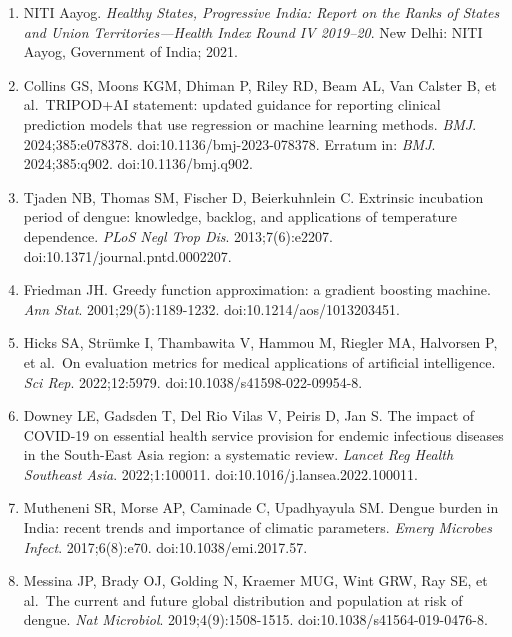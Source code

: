 \documentclass[
  10pt,
  twocolumn]{article}
\begin{document}
\begin{enumerate}
  doi:10.1016/j.patter.2023.100804.
\item
  NITI Aayog. \emph{Healthy States, Progressive India: Report on the
  Ranks of States and Union Territories---Health Index Round IV
  2019--20}. New Delhi: NITI Aayog, Government of India; 2021.
\item
  Collins GS, Moons KGM, Dhiman P, Riley RD, Beam AL, Van Calster B, et
  al.~TRIPOD+AI statement: updated guidance for reporting clinical
  prediction models that use regression or machine learning methods.
  \emph{BMJ}. 2024;385:e078378. doi:10.1136/bmj-2023-078378. Erratum in:
  \emph{BMJ}. 2024;385:q902. doi:10.1136/bmj.q902.
\item
  Tjaden NB, Thomas SM, Fischer D, Beierkuhnlein C. Extrinsic incubation
  period of dengue: knowledge, backlog, and applications of temperature
  dependence. \emph{PLoS Negl Trop Dis}. 2013;7(6):e2207.
  doi:10.1371/journal.pntd.0002207.
\item
  Friedman JH. Greedy function approximation: a gradient boosting
  machine. \emph{Ann Stat}. 2001;29(5):1189-1232.
  doi:10.1214/aos/1013203451.
\item
  Hicks SA, Strümke I, Thambawita V, Hammou M, Riegler MA, Halvorsen P,
  et al.~On evaluation metrics for medical applications of artificial
  intelligence. \emph{Sci Rep}. 2022;12:5979.
  doi:10.1038/s41598-022-09954-8.
\item
  Downey LE, Gadsden T, Del Rio Vilas V, Peiris D, Jan S. The impact of
  COVID-19 on essential health service provision for endemic infectious
  diseases in the South-East Asia region: a systematic review.
  \emph{Lancet Reg Health Southeast Asia}. 2022;1:100011.
  doi:10.1016/j.lansea.2022.100011.
\item
  Mutheneni SR, Morse AP, Caminade C, Upadhyayula SM. Dengue burden in
  India: recent trends and importance of climatic parameters.
  \emph{Emerg Microbes Infect}. 2017;6(8):e70. doi:10.1038/emi.2017.57.
\item
  Messina JP, Brady OJ, Golding N, Kraemer MUG, Wint GRW, Ray SE, et
  al.~The current and future global distribution and population at risk
  of dengue. \emph{Nat Microbiol}. 2019;4(9):1508-1515.
  doi:10.1038/s41564-019-0476-8.
\end{enumerate}
\end{document}
